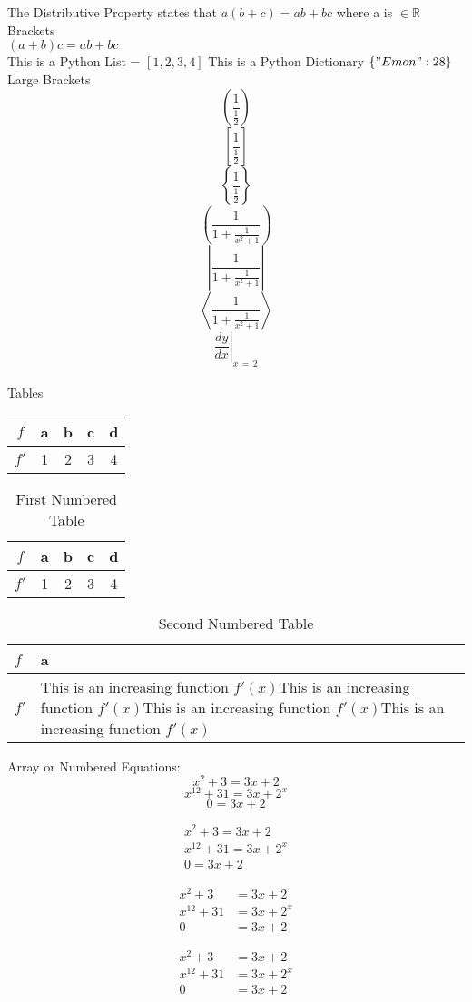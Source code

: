 \documentclass{article}
\begin{document}
The Distributive Property states that $a(b+c)=ab+bc$ where a is $\in \mathbb{R}$
\\[10pt]
Brackets \\[3pt]

$(a+b)c = ab+bc $\\
This is a Python List = $[1,2,3,4]$
This is a Python Dictionary $\{"Emon" : 28\}$
\\[1cm]
Large Brackets
$$		\left(\frac{1}{\frac{1}{2}}\right)	$$
$$		\left[\frac{1}{\frac{1}{2}}\right]	$$
$$		\left\{\frac{1}{\frac{1}{2}}\right\}	$$
$$		\left(\frac{1}{1+\frac{1}{x^2+1}}\right)	$$
$$		\left|\frac{1}{1+\frac{1}{x^2+1}}\right|	$$
$$		\left\langle\frac{1}{1+\frac{1}{x^2+1}}\right\rangle	$$
$$		\left. \frac{dy}{dx} \right|_{x\,=\,2}	$$
\\[1cm]


Tables\\[5pt]
\begin{tabular}{|c|c|c|c|c|}
\hline
$f$&a & b & c & d \\ 
\hline
$f'$&1 & 2 & 3 & 4 \\ 
\hline
\end{tabular}


\begin{table}[H]
\centering
\begin{tabular}{|c|c|c|c|c|}
\hline
$f$&a & b & c & d \\ 
\hline
$f'$&1 & 2 & 3 & 4 \\ 
\hline
\end{tabular}
\caption{First Numbered Table}
\end{table}


\begin{table}[H]
\centering
\caption{Second Numbered Table}
\vspace{1cm}
\begin{tabular}{|l|p{2in}|}
\hline
$f$&a \\ 
\hline
$f'$&This is an increasing function $f'(x)$This is an increasing function $f'(x)$This is an increasing function $f'(x)$This is an increasing function $f'(x)$\\ 
\hline
\end{tabular}
\end{table}

\vspace{1cm}

Array or Numbered Equations:\\

$$ x^2+3 = 3x+2 $$
$$ x^{12}+31 = 3x+2^x $$
$$ 0= 3x+2 $$


\begin{align}
x^2+3 = 3x+2 \\
x^{12}+31 = 3x+2^x \\
0= 3x+2
\end{align}

\begin{align*}
x^2+3 &= 3x+2 \\
x^{12}+31 &= 3x+2^x \\
0 &= 3x+2
\end{align*}



\begin{align}
x^2+3 &= 3x+2 \\
x^{12}+31 &= 3x+2^x \\
0 &= 3x+2
\end{align}
\end{document}
